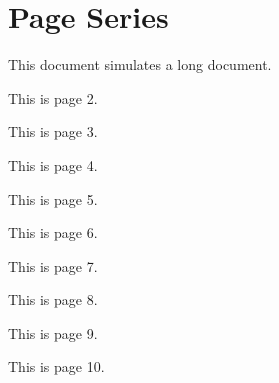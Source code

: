 \documentclass{article}
\begin{document}
\section*{Page Series}
This document simulates a long document.

\newpage
This is page 2.

\newpage
This is page 3.

\newpage
This is page 4.

\newpage
This is page 5.

\newpage
This is page 6.

\newpage
This is page 7.

\newpage
This is page 8.

\newpage
This is page 9.

\newpage
This is page 10.
\end{document}
